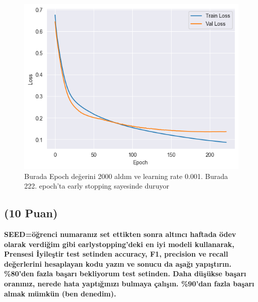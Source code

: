 \documentclass[11pt]{article}
\begin{document}
\begin{figure}
    \centering
    \includegraphics{best.png}
    \caption{Burada Epoch değerini 2000 aldım ve learning rate 0.001. Burada 222. epoch'ta early stopping sayesinde duruyor }
    \label{fig:my_pic}
\end{figure}

\pagebreak

\subsection{(10 Puan)} \textbf{SEED=öğrenci numaranız set ettikten sonra altıncı haftada ödev olarak verdiğim gibi earlystopping'deki en iyi modeli kullanarak, Prensesi İyileştir test setinden accuracy, F1, precision ve recall değerlerini hesaplayan kodu yazın ve sonucu da aşağı yapıştırın. \%80'den fazla başarı bekliyorum test setinden. Daha düşükse başarı oranınız, nerede hata yaptığınızı bulmaya çalışın. \%90'dan fazla başarı almak mümkün (ben denedim).}
\end{document}

